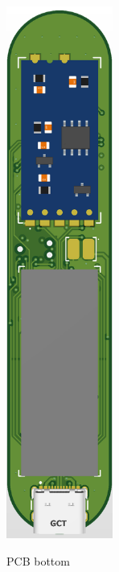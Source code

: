 \begin{figure}[H]
\begin{subfigure}{0.24\textwidth}
{\includegraphics[height=17.5cm, page=4]{../../5_Hardware/WSBR_Board/Project Outputs for WSBR_Board/PCB 3D Print BOT/WSBR_Board.png}}
\caption{PCB bottom}
\end{subfigure}
\begin{subfigure}{0.24\textwidth}
\framebox{
}
\end{subfigure}
\end{figure}

